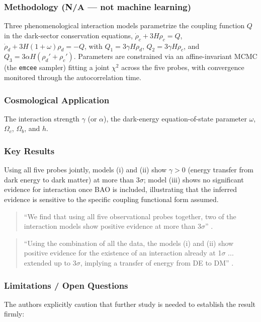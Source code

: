 \documentclass[11pt]{article}
\begin{document}
\subsubsection{Methodology (N/A --- not machine learning)}
Three phenomenological interaction models parametrize the coupling function $Q$ in the dark-sector conservation equations, $\dot\rho_c+3H\rho_c=Q$, $\dot\rho_d+3H(1+\omega)\rho_d=-Q$, with $Q_1=3\gamma H\rho_d$, $Q_2=3\gamma H\rho_c$, and $Q_3=3\alpha H(\rho_d'+\rho_c')$. Parameters are constrained via an affine-invariant MCMC (the \texttt{emcee} sampler) fitting a joint $\chi^2$ across the five probes, with convergence monitored through the autocorrelation time.

\subsubsection{Cosmological Application}
The interaction strength $\gamma$ (or $\alpha$), the dark-energy equation-of-state parameter $\omega$, $\Omega_c$, $\Omega_b$, and $h$.

\subsubsection{Key Results}
Using all five probes jointly, models (i) and (ii) show $\gamma>0$ (energy transfer from dark energy to dark matter) at more than 3$\sigma$; model (iii) shows no significant evidence for interaction once BAO is included, illustrating that the inferred evidence is sensitive to the specific coupling functional form assumed.

\begin{quote}
\enquote{We find that using all five observational probes together, two of the interaction models show positive evidence at more than 3$\sigma$} \citep[p.~1]{grandon2018evidence}.
\end{quote}

\begin{quote}
\enquote{Using the combination of all the data, the models (i) and (ii) show positive evidence for the existence of an interaction already at 1$\sigma$ ... extended up to 3$\sigma$, implying a transfer of energy from DE to DM} \citep[p.~14]{grandon2018evidence}.
\end{quote}

\subsubsection{Limitations / Open Questions}
The authors explicitly caution that further study is needed to establish the result firmly:
\end{document}
